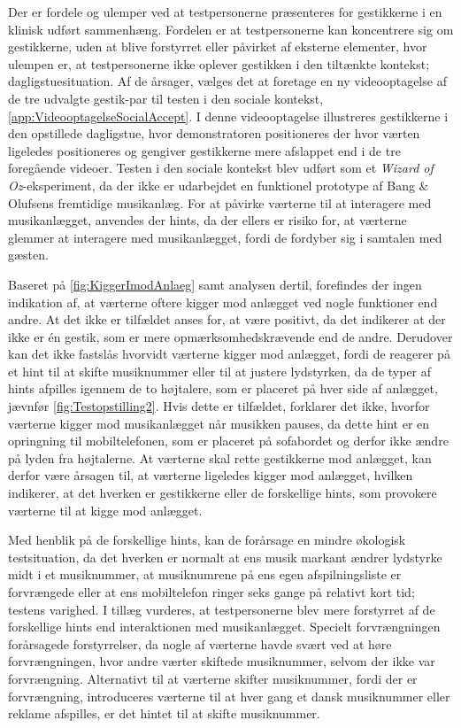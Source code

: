 Der er fordele og ulemper ved at testpersonerne præsenteres for gestikkerne i en klinisk udført sammenhæng. Fordelen er at testpersonerne kan koncentrere sig om gestikkerne, uden at blive forstyrret eller påvirket af eksterne elementer, hvor ulempen er, at testpersonerne ikke oplever gestikken i den tiltænkte kontekst; dagligstuesituation. Af de årsager, vælges det at foretage en ny videooptagelse af de tre udvalgte gestik-par til testen i den sociale kontekst, \autoref{app:VideooptagelseSocialAccept}. I denne videooptagelse illustreres gestikkerne i den opstillede dagligstue, hvor demonstratoren positioneres der hvor værten ligeledes positioneres og gengiver gestikkerne mere afslappet end i de tre foregående videoer.\blankline 
%
Testen i den sociale kontekst blev udført som et \textit{Wizard of Oz}-eksperiment, da der ikke er udarbejdet en funktionel prototype af Bang $\&$ Olufsens fremtidige musikanlæg. For at påvirke værterne til at interagere med musikanlægget, anvendes der hints, da der ellers er risiko for, at værterne glemmer at interagere med musikanlægget, fordi de fordyber sig i samtalen med gæsten. 

Baseret på \autoref{fig:KiggerImodAnlaeg} samt analysen dertil, forefindes der ingen indikation af, at værterne oftere kigger mod anlægget ved nogle funktioner end andre. At det ikke er tilfældet anses for, at være positivt, da det indikerer at der ikke er én gestik, som er mere opmærksomhedskrævende end de andre. Derudover kan det ikke fastslås hvorvidt værterne kigger mod anlægget, fordi de reagerer på et hint til at skifte musiknummer eller til at justere lydstyrken, da de typer af hints afpilles igennem de to højtalere, som er placeret på hver side af anlægget, jævnfør \autoref{fig:Testopstilling2}. Hvis dette er tilfældet, forklarer det ikke, hvorfor værterne kigger mod musikanlægget når musikken pauses, da dette hint er en opringning til mobiltelefonen, som er placeret på sofabordet og derfor ikke ændre på lyden fra højtalerne. At værterne skal rette gestikkerne mod anlægget, kan derfor være årsagen til, at værterne ligeledes kigger mod anlægget, hvilken indikerer, at det hverken er gestikkerne eller de forskellige hints, som provokere værterne til at kigge mod anlægget.     

Med henblik på de forskellige hints, kan de forårsage en mindre økologisk testsituation, da det hverken er normalt at ens musik markant ændrer lydstyrke midt i et musiknummer, at musiknumrene på ens egen afspilningsliste er forvrængede eller at ens mobiltelefon ringer seks gange på relativt kort tid; testens varighed. I tillæg vurderes, at testpersonerne blev mere forstyrret af de forskellige hints end interaktionen med musikanlægget. Specielt forvrængningen forårsagede forstyrrelser, da nogle af værterne havde svært ved at høre forvrængningen, hvor andre værter skiftede musiknummer, selvom der ikke var forvrængning. Alternativt til at værterne skifter musiknummer, fordi der er forvrængning, introduceres værterne til at hver gang et dansk musiknummer eller reklame afspilles, er det hintet til at skifte musiknummer.

